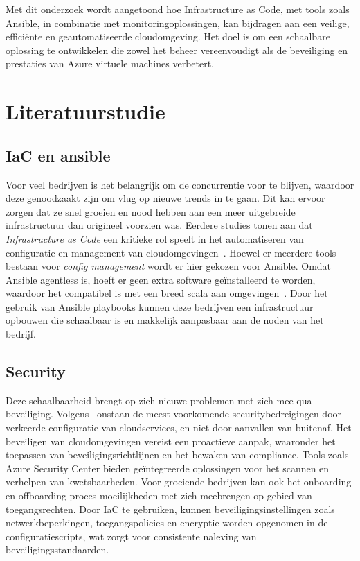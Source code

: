 Met dit onderzoek wordt aangetoond hoe Infrastructure as Code, met tools zoals Ansible, in combinatie met monitoringoplossingen, kan bijdragen aan een veilige, efficiënte en geautomatiseerde cloudomgeving.
Het doel is om een schaalbare oplossing te ontwikkelen die zowel het beheer vereenvoudigt als de beveiliging en prestaties van Azure virtuele machines verbetert.


\section{Literatuurstudie}%
\label{sec:literatuurstudie}

\subsection{IaC en ansible}%

Voor veel bedrijven is het belangrijk om de concurrentie voor te blijven, waardoor deze genoodzaakt zijn om vlug op nieuwe trends in te gaan.
Dit kan ervoor zorgen dat ze snel groeien en nood hebben aan een meer uitgebreide infrastructuur dan origineel voorzien was.
Eerdere studies tonen aan dat \emph{Infrastructure as Code} een kritieke rol speelt in het automatiseren van configuratie en management van cloudomgevingen~\autocite{Kalliomaa2024}.
Hoewel er meerdere tools bestaan voor \emph{config management} wordt er hier gekozen voor Ansible.
Omdat Ansible agentless is, hoeft er geen extra software geïnstalleerd te worden, waardoor het compatibel is met een breed scala aan omgevingen~\autocite{Elradi2023}.
Door het gebruik van Ansible playbooks kunnen deze bedrijven een infrastructuur opbouwen die schaalbaar is en makkelijk aanpasbaar aan de noden van het bedrijf.

\subsection{Security}%

Deze schaalbaarheid brengt op zich nieuwe problemen met zich mee qua beveiliging.
Volgens~\textcite{Ots2021} onstaan de meest voorkomende securitybedreigingen door verkeerde configuratie van cloudservices, en niet door aanvallen van buitenaf.
Het beveiligen van cloudomgevingen vereist een proactieve aanpak, waaronder het toepassen van beveiligingsrichtlijnen en het bewaken van compliance.
Tools zoals Azure Security Center bieden geïntegreerde oplossingen voor het scannen en verhelpen van kwetsbaarheden.
Voor groeiende bedrijven kan ook het onboarding- en offboarding proces moeilijkheden met zich meebrengen op gebied van toegangsrechten.
Door IaC te gebruiken, kunnen beveiligingsinstellingen zoals netwerkbeperkingen, toegangspolicies en encryptie worden opgenomen in de configuratiescripts, wat zorgt voor consistente naleving van beveiligingsstandaarden.

